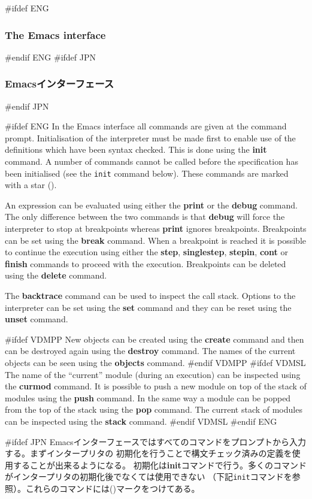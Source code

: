 \documentclass[\pformat,12pt]{article}
\newcommand{\cmd}{\tt }
\begin{document}
#ifdef ENG
\subsubsection{The Emacs interface}
#endif ENG
#ifdef JPN
\subsubsection{Emacsインターフェース}
#endif JPN

#ifdef ENG
In the Emacs interface all commands are given at the command
prompt. Initialisation of the interpreter must be made first to enable
use of the definitions which have been syntax checked. This is done
using the \textbf{init} command. A number of commands cannot be
called before the specification has 
been initialised (see the {\cmd init} command below).  These commands
are marked with a star ({\tt *}).

An expression can be evaluated using
either the \textbf{print} or the \textbf{debug} command.  The only
difference between the two commands is that {\bf debug} will force
the interpreter to stop at breakpoints whereas {\bf print} ignores
breakpoints. Breakpoints can be set using
the \textbf{break} command. When a breakpoint is reached it is
possible to continue the execution using either the \textbf{step},
\textbf{singlestep}, \textbf{stepin}, \textbf{cont} or \textbf{finish}
commands to
proceed with the execution. Breakpoints can be deleted using the
\textbf{delete} command.

The \textbf{backtrace} command can be used to inspect the call stack.
Options to the interpreter can be set using the \textbf{set} command
and they can be reset using the \textbf{unset} command.

#ifdef VDMPP
New objects can be created using the \textbf{create} command and then
can be destroyed again using the \textbf{destroy} command. The names
of the current objects can be seen using the \textbf{objects} command.
#endif VDMPP
#ifdef VDMSL
The name of the ``current'' module (during an execution) can be
inspected using the \textbf{curmod} command. It is possible to push a
new module on top of the stack of modules using the \textbf{push}
command. In the same way a module can be popped from the top of the
stack using the \textbf{pop} command. The current stack of modules can
be inspected using the \textbf{stack} command.
#endif VDMSL
#endif ENG

#ifdef JPN
Emacsインターフェースではすべてのコマンドをプロンプトから入力する。まずインタープリタの
初期化を行うことで構文チェック済みの定義を使用することが出来るようになる。
初期化は\textbf{init}コマンドで行う。多くのコマンドがインタープリタの初期化後でなくては使用できない
（下記{\cmd init}コマンドを参照）。これらのコマンドには({\tt *})マークをつけてある。
\end{document}
